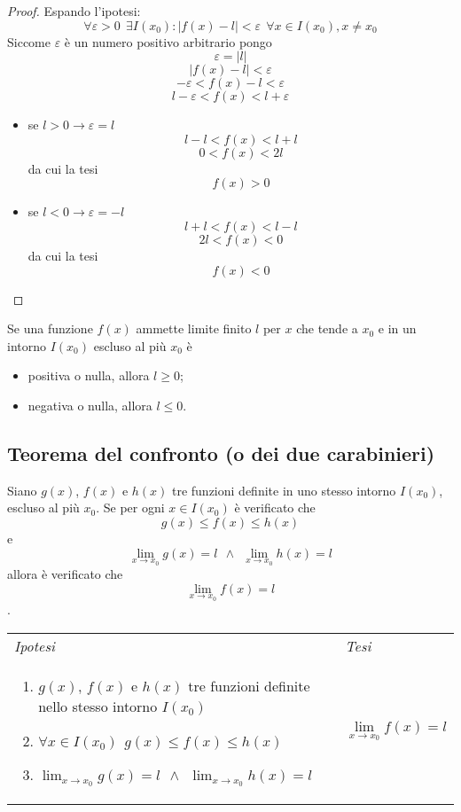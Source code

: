         \begin{proof}
        Espando l'ipotesi:
        \[\forall \varepsilon > 0 ~~\exists I(x_0) : |f(x)-l|<\varepsilon~~\forall x \in I(x_0), x\neq x_0\]
        Siccome $\varepsilon$ è un numero positivo arbitrario pongo 
        \[\varepsilon = |l|\]
        \[|f(x)-l|<\varepsilon\]
        \[-\varepsilon <f(x)-l<\varepsilon\]
        \[l-\varepsilon<f(x)<l+\varepsilon\]
        \begin{itemize}
            \item se $l>0 \rightarrow \varepsilon =l$
            \[l-l<f(x)<l+l\]
            \[0<f(x)<2l\]
            da cui la tesi\[f(x)>0\]
            \item se $l<0 \rightarrow \varepsilon =-l$
            \[l+l<f(x)<l-l\]
            \[2l<f(x)<0\]
            da cui la tesi\[f(x)<0\]
        \end{itemize}
        \end{proof}
        
        \begin{shadedTheorem}
            Se una funzione $f(x)$ ammette limite finito $l$ per $x$ che tende a $x_0$ e in un intorno $I(x_0)$ escluso al più $x_0$ è 
            \begin{itemize}
                \item positiva o nulla, allora $l\geq 0$;
                \item negativa o nulla, allora $l\leq 0$.
            \end{itemize}
        \end{shadedTheorem}
        
    \subsection{Teorema del confronto (o dei due carabinieri)}
        \begin{shadedTheorem}[Confronto]
            Siano $g(x)$, $f(x)$ e $h(x)$ tre funzioni definite in uno stesso intorno $I(x_0)$, escluso al più $x_0$. Se per ogni $x\in I(x_0)$ è verificato che \[g(x)\leq f(x) \leq h(x)\]
            e \[\lim_{x\rightarrow x_0} g(x)=l ~~ \land ~~ \lim_{x\rightarrow x_0} h(x)=l\]
            allora è verificato che
            \[\lim_{x\rightarrow x_0} f(x)=l\].
        \end{shadedTheorem}
        \begin{tabular}{m{}m{}}
            \textit{Ipotesi} & \textit{Tesi}  \\
            \begin{enumerate}
                \item $g(x)$, $f(x)$ e $h(x)$ tre funzioni definite nello stesso intorno $I(x_0)$
                \item $\forall x \in I(x_0) ~~ g(x)\leq f(x) \leq h(x)$
                \item $\displaystyle\lim_{x\rightarrow x_0} g(x)=l ~~ \land ~~ \lim_{x\rightarrow x_0} h(x)=l$
            \end{enumerate} & \[\lim_{x\rightarrow x_0} f(x)=l\]\\
        \end{tabular}
        
